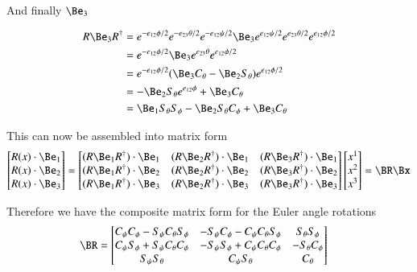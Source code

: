 \documentclass{article}
\begin{document}
And finally $\Be_3$

\begin{align*}
R \Be_3 R^\dagger
&= 
e^{-e_{12}\phi/2} e^{-e_{23}\theta/2} e^{-e_{12}\psi/2}
\Be_3
e^{e_{12}\psi/2}
e^{e_{23}\theta/2} 
e^{e_{12}\phi/2} \\
&= 
e^{-e_{12}\phi/2} 
\Be_3 e^{e_{23}\theta} 
e^{e_{12}\phi/2} \\
&= 
e^{-e_{12}\phi/2} 
(
\Be_3 C_\theta
-\Be_2 S_\theta
)
e^{e_{12}\phi/2} \\
&= -\Be_2 S_\theta e^{e_{12}\phi} +\Be_3 C_\theta \\
&= 
 \Be_1 S_\theta S_\phi
-\Be_2 S_\theta C_\phi
+\Be_3 C_\theta \\
\end{align*}

This can now be assembled into matrix form
\begin{align*}
\begin{bmatrix}
R(x) \cdot \Be_1 \\
R(x) \cdot \Be_2 \\
R(x) \cdot \Be_3
\end{bmatrix}
=
\begin{bmatrix}
(R \Be_1 R^\dagger) \cdot \Be_1 & (R \Be_2 R^\dagger) \cdot \Be_1 & (R \Be_3 R^\dagger) \cdot \Be_1 \\
(R \Be_1 R^\dagger) \cdot \Be_2 & (R \Be_2 R^\dagger) \cdot \Be_2 & (R \Be_3 R^\dagger) \cdot \Be_2 \\
(R \Be_1 R^\dagger) \cdot \Be_3 & (R \Be_2 R^\dagger) \cdot \Be_3 & (R \Be_3 R^\dagger) \cdot \Be_3 \\
\end{bmatrix}
\begin{bmatrix}
x^1 \\
x^2 \\
x^3 \\
\end{bmatrix} = \BR \Bx
\end{align*}

Therefore we have the composite matrix form for the Euler angle rotations
\begin{align*}
\BR &=
\begin{bmatrix}
C_\psi C_\phi - S_\psi C_\theta S_\phi & -S_\psi C_\phi - C_\psi C_\theta S_\phi & S_\theta S_\phi \\
C_\psi S_\phi + S_\psi C_\theta C_\phi & -S_\psi S_\phi + C_\psi C_\theta C_\phi & -S_\theta C_\phi \\
S_\psi S_\theta                        &                  C_\psi S_\theta        & C_\theta \\
\end{bmatrix}
\end{align*}
\end{document}
